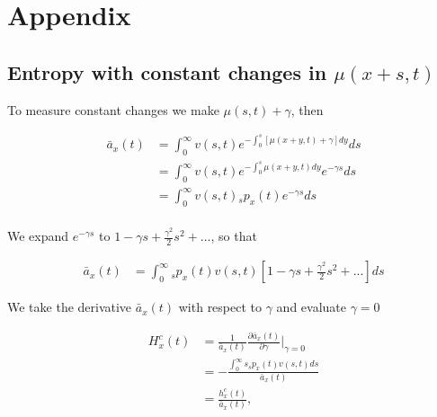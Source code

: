 \documentclass[12pt]{article}
\begin{document}
\newpage


%
%



\newpage

\appendix
\section{Appendix}



\subsection{Entropy with constant changes in $\mu(x+s,t)$}\label{sec:EntropyConst}

To measure constant changes we make $\mu(s,t)+\gamma$, then

\begin{equation}\label{eq:EntropyConst1}
\begin{split}
\bar{a}_{x}(t) &= \int_0^\infty{v}(s,t) e^{-\int_{0}^{s} [\mu(x+y,t)+\gamma]dy}ds \\
&= \int_0^\infty {v}(s,t)e^{-\int_{0}^{s} \mu(x+y,t)dy} e^{-\gamma s}ds \\
&= \int_0^\infty {v}(s,t){}_sp_x(t) e^{-\gamma s}ds \\
\end{split}
\end{equation}

We expand $e^{-\gamma s}$ to $1-\gamma s+\frac{\gamma^2}{2} s^{2} +...$, so that


\begin{equation}\label{eq:EntropyConst2}
\begin{split}
\bar{a}_{x}(t) &= \int_0^\infty {}_sp_x(t) {v}(s,t)[1-\gamma s+\frac{\gamma^2}{2} s^{2} +...]ds
\end{split}
\end{equation}

We take the derivative $\bar{a}_{x}(t)$ with respect to $\gamma$ and evaluate $\gamma=0$


\begin{equation}\label{eq:EntropyConst3}
\begin{split}
{H}^{c}_x(t)&=\frac{1}{\bar{a}_x(t)}\frac{\partial \bar{a}_x(t)}{\partial \gamma} \bigg\rvert_{\gamma=0}\\
&= -\frac{\int_0^\infty s {}_sp_x(t) {v}(s,t)ds}{\bar{a}_x(t)} \\
&= \frac{{h}^{c}_x(t)}{\bar{a}_x(t)},
\end{split}
\end{equation}
\end{document}
